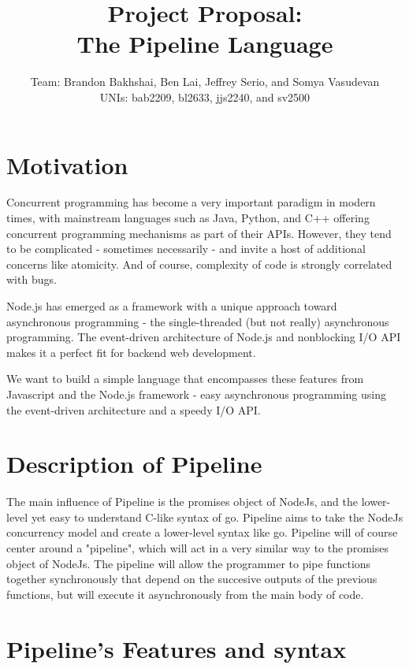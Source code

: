 \documentclass[11pt]{article}
\title{\textbf{Project Proposal:\\ The Pipeline Language}}
\author{Team: Brandon Bakhshai, Ben Lai, Jeffrey Serio, and Somya Vasudevan \\ UNIs: bab2209, bl2633, jjs2240, and sv2500}
\begin{document}
\maketitle
\thispagestyle{empty}
\renewcommand{\thesubsubsection}{\thesubsection.\alph{subsubsection}.} 


\section{Motivation}
\hspace{0.5cm} Concurrent programming has become a very important paradigm in modern times, with mainstream languages such as Java, Python, and C++ offering concurrent programming mechanisms as part of their APIs. However, they tend to be complicated - sometimes necessarily - and invite a host of additional concerns like atomicity. And of course, complexity of code is strongly correlated with bugs. 

Node.js has emerged as a framework with a unique approach toward asynchronous programming - the single-threaded (but not really) asynchronous programming. The event-driven architecture of Node.js and nonblocking I/O API makes it a perfect fit for backend web development.

We want to build a simple language that encompasses these features from Javascript and the Node.js framework - easy asynchronous programming using the event-driven architecture and a speedy I/O API.

\section{Description of Pipeline}
\hspace{0.5cm} The main influence of Pipeline is the promises object of NodeJs, and the lower-level yet easy to understand C-like syntax of go. Pipeline aims to take the NodeJs concurrency model and create a lower-level syntax like go. Pipeline will of course center around a "pipeline", which will act in a very similar way to the promises object of NodeJs. The pipeline will allow the programmer to pipe functions together synchronously that depend on the succesive outputs of the previous functions, but will execute it asynchronously from the main body of code. 

\section{Pipeline's Features and syntax}
\end{document}
